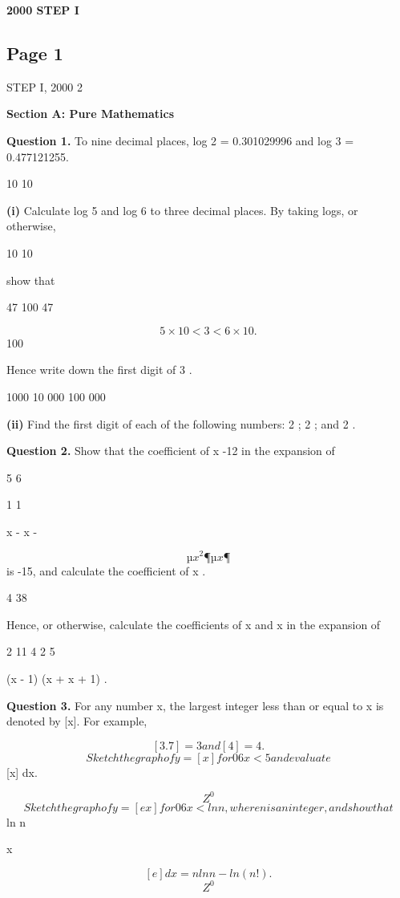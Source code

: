 \documentclass[12pt]{article}
\begin{document}
\begin{center}
{\Large \textbf{2000 STEP I}}
\end{center}

\subsection*{Page 1}
\begin{flushleft}
STEP I, 2000 2\par
\bigskip\textbf{Section A: Pure Mathematics}\par
\bigskip\textbf{Question 1.} To nine decimal places, log 2 = 0.301029996 and log 3 = 0.477121255.\par
10 10\par
\textbf{(i)} Calculate log 5 and log 6 to three decimal places. By taking logs, or otherwise,\par
10 10\par
show that\par
47 100 47\par
\[5 \times 10 < 3 < 6 \times 10 .\]
100\par
Hence write down the first digit of 3 .\par
1000 10 000 100 000\par
\textbf{(ii)} Find the first digit of each of the following numbers: 2 ; 2 ; and 2 .\par
\bigskip\textbf{Question 2.} Show that the coefficient of x -12 in the expansion of\par
5 6\par
1 1\par
x - x -\par
\[µ x^2 ¶ µ x ¶\]
is -15, and calculate the coefficient of x .\par
4 38\par
Hence, or otherwise, calculate the coefficients of x and x in the expansion of\par
2 11 4 2 5\par
(x - 1) (x + x + 1) .\par
\bigskip\textbf{Question 3.} For any number x, the largest integer less than or equal to x is denoted by [x]. For example,\par
\[[3.7] = 3 and [4] = 4.\]
\[Sketch the graph of y = [x] for 0 6 x < 5 and evaluate\]
[x] dx.\par
\[Z^0\]
\[Sketch the graph of y = [ e x ] for 0 6 x < ln n, where n is an integer, and show that\]
ln n\par
x\par
\[[ e ] dx = n ln n - ln(n!).\]
\[Z^0\]
\end{flushleft}
\end{document}
